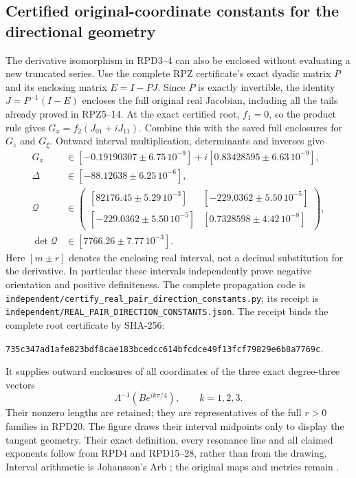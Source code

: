 \subsection{Certified original-coordinate constants for the directional geometry}
The derivative isomorphism in RPD3--4 can also be enclosed without
evaluating a new truncated series.  Use the complete RPZ certificate's
exact dyadic matrix $P$ and its enclosing matrix $E=I-PJ$.  Since $P$
is exactly invertible, the identity $J=P^{-1}(I-E)$ encloses the full
original real Jacobian, including all the tails already proved in
RPZ5--14.  At the exact certified root, $f_1=0$, so the product rule
gives $G_x=f_2(J_{01}+iJ_{11})$.  Combine this with the saved full
enclosures for $G_z$ and $G_\xi$.  Outward interval multiplication,
determinants and inverses give
\[
\begin{aligned}
 G_x&\in[-0.19190307\pm6.75\,10^{-9}]
              +i[0.83428595\pm6.63\,10^{-9}],\\
 \Delta&\in[-88.12638\pm6.25\,10^{-6}],\\
 \mathcal Q&\in
 \begin{pmatrix}
 [82176.45\pm5.29\,10^{-3}]&[-229.0362\pm5.50\,10^{-5}]\\
 [-229.0362\pm5.50\,10^{-5}]&[0.7328598\pm4.42\,10^{-8}]
 \end{pmatrix},\\
 \det\mathcal Q&\in[7766.26\pm7.77\,10^{-3}].
\end{aligned}\tag{RPD31}
\]
Here $[m\pm r]$ denotes the enclosing real interval, not a decimal
substitution for the derivative.  In particular these intervals
independently prove negative orientation and positive definiteness.
The complete propagation code is
\nolinkurl{independent/certify_real_pair_direction_constants.py};
its receipt is \nolinkurl{independent/REAL_PAIR_DIRECTION_CONSTANTS.json}.
The receipt binds the complete root certificate by SHA-256:
\par\noindent
\texttt{735c347ad1afe823bdf8cae183bcedcc614bfcdce49f13fcf79829e6b8a7769c}.
\par
It supplies outward enclosures of all coordinates of the three exact
degree-three vectors
\[
\Lambda^{-1}(B e^{ik\pi/4}),\qquad k=1,2,3.
\]
Their nonzero lengths are retained; they are representatives of
the full $r>0$ families in RPD20.  The figure draws their interval
midpoints only to display the tangent geometry.  Their exact
definition, every resonance line and all claimed exponents follow
from RPD4 and RPD15--28, rather than from the drawing.
Interval arithmetic is Johansson's Arb \cite{human:arb2016}; the
original maps and metrics remain \cite{PCLOriginal,WCF}.
